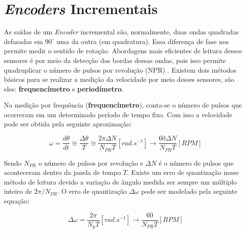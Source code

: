 \section{\textit{Encoders} Incrementais}
\label{sec:encoders}


As saídas de um \emph{Encoder} incremental são, normalmente, duas ondas quadradas defasadas em $90^\circ$ uma da outra (em quadratura). Essa diferença de fase nos permite medir o sentido de rotação. Abordagens mais eficientes de leitura desses sensores é por meio da detecção das bordas dessas ondas, pois isso permite quadruplicar o número de pulsos por revolução (NPR) \cite{quantization_error01}. Existem dois métodos básicos para se realizar a medição da velocidade por meio desses sensores, são eles: \textbf{frequencímetro} e \textbf{periodímetro}. 

Na medição por frequência (\textbf{frequencímetro}), conta-se o número de pulsos que ocorreram em um determinado período de tempo fixo. Com isso a velocidade pode ser obtida pela seguinte aproximação:

\begin{equation}
    \omega = \frac{d\theta}{dt} \cong \frac{\Delta{\theta}}{T} \cong \frac{2 \pi \Delta{N}}{N_{PR}T}[rad.s^{-1}] \xrightarrow{} \frac{60 \Delta{N}}{N_{PR} T} [RPM]
\end{equation}

Sendo $N_{PR}$ o número de pulsos por revolução e $\Delta{N}$ é o número de pulsos que aconteceram dentro da janela de tempo $T$. Existe um erro de quantização nesse método de leitura devido a variação de ângulo medida ser sempre um múltiplo inteiro de $ 2\pi/N_{PR}$. O erro de quantização $\Delta{\omega}$ pode ser modelado pela seguinte equação:

\begin{equation}
    \Delta{\omega} = \frac{2\pi}{N_{p}T}[rad.s^{-1}] \xrightarrow{} \frac{60}{N_{PR}T}[RPM]
    \label{eq:erro_de_quantizacao_frequencimetro}
\end{equation}

